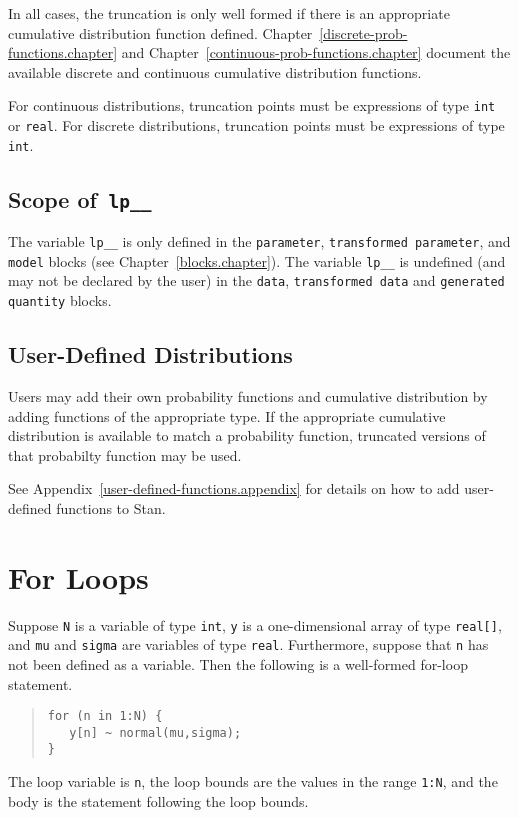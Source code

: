 \documentclass[10pt]{report}
\newcommand{\Stan}{Stan\xspace}
\newcommand{\code}[1]{{\tt #1}}
\newcommand{\refappendix}[1]{Appendix~\ref{#1.appendix}}
\newcommand{\refchapter}[1]{Chapter~\ref{#1.chapter}}
\begin{document}
In all cases, the truncation is only well formed if there is an
appropriate cumulative distribution function defined.
\refchapter{discrete-prob-functions} and
\refchapter{continuous-prob-functions} document the available discrete
and continuous cumulative distribution functions.

For continuous distributions, truncation points must be expressions of
type \code{int} or \code{real}.  For discrete distributions, truncation
points must be expressions of type \code{int}.


\subsection{Scope of\, \code{lp\_\_}}

The variable \code{lp\_\_} is only defined in the \code{parameter},
\code{transformed parameter}, and \code{model} blocks (see
\refchapter{blocks}).  The variable \code{lp\_\_} is undefined (and
may not be declared by the user) in the \code{data}, \code{transformed
  data} and \code{generated quantity} blocks.

\subsection{User-Defined Distributions}

Users may add their own probability functions and cumulative
distribution by adding functions of the appropriate type.  If the
appropriate cumulative distribution is available to match a
probability function, truncated versions of that probabilty function
may be used. 

See \refappendix{user-defined-functions} for details on how to add
user-defined functions to \Stan.


\section{For Loops}

Suppose
\code{N} is a variable of type \code{int}, \code{y} is a
one-dimensional array of type \code{real[]}, and \code{mu} and
\code{sigma} are variables of type \code{real}.  Furthermore, suppose
that \code{n} has not been defined as a variable. Then the following
is a well-formed for-loop statement.
%
\begin{quote}
\begin{Verbatim}
for (n in 1:N) {
   y[n] ~ normal(mu,sigma);
}
\end{Verbatim}
\end{quote}
%
The loop variable is \code{n}, the loop bounds are the values in the
range \code{1:N}, and the body is the statement following the
loop bounds.  
\end{document}
